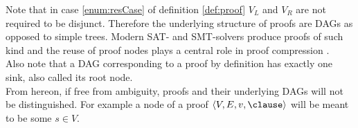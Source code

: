 \noindent
Note that in case \ref{enum:resCase} of definition \ref{def:proof} $V_L$ and $V_R$ are not required to be disjunct. Therefore the underlying structure of proofs are DAGs as opposed to simple trees. Modern SAT- and SMT-solvers produce proofs of such kind \cite{BoutonCaminha-B.-de-OliveiraDeharbeFontaine2009veriT:-an-open-trustable-and-efficient-SMT-Solver,marques2009conflict} and the reuse of proof nodes plays a central role in proof compression \cite{fontaine2011compression}.\\
Also note that a DAG corresponding to a proof by definition has exactly one sink, also called its root node.\\
From hereon, if free from ambiguity, proofs and their underlying DAGs will not be distinguished. For example a node of a proof $\langle V,E,\n,\clause \rangle$ will be meant to be some $s \in V$.
